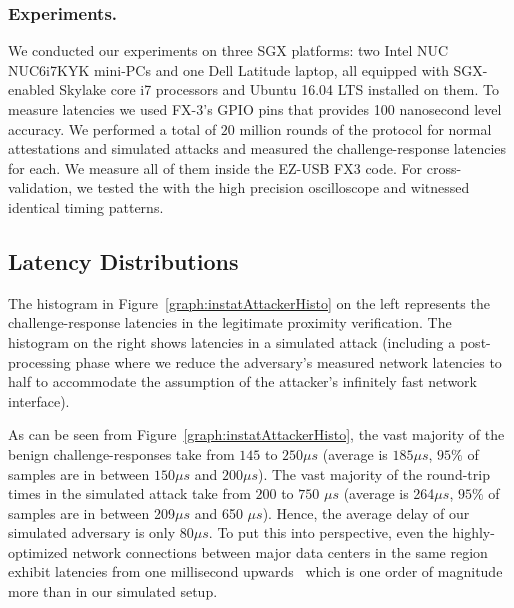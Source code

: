 \subsubsection{Experiments.}
We conducted our experiments on three SGX platforms: two Intel NUC NUC6i7KYK mini-PCs and one Dell Latitude laptop, all equipped with SGX-enabled Skylake core i7 processors and Ubuntu 16.04 LTS installed on them. To measure latencies we used FX-3's GPIO pins that provides 100 nanosecond level accuracy. We performed a total of $20$ million rounds of the protocol for normal attestations and simulated attacks and measured the challenge-response latencies for each. We measure all of them inside the EZ-USB FX3 code. For cross-validation, we tested the \device with the high precision oscilloscope and witnessed identical timing patterns.


\subsection{Latency Distributions}
\label{sec:evaluation:results}



The histogram in Figure~\ref{graph:instatAttackerHisto} on the left represents the challenge-response latencies in the legitimate proximity verification. The histogram on the right shows latencies in a simulated attack (including a post-processing phase where we reduce the adversary's measured network latencies to half to accommodate the assumption of the attacker's infinitely fast network interface).

As can be seen from Figure~\ref{graph:instatAttackerHisto}, the vast majority of the benign challenge-responses take from $145$ to $250 \mu s$ (average is $185 \mu s$, $95\%$ of samples are in between $150\mu s$ and  $200\mu s$). The vast majority of the round-trip times in the simulated attack take from $200$ to $750$ $\mu s$ (average is 264$\mu s$, $95\%$ of samples are in between 209$\mu s$ and 650 $\mu s$). Hence, the average delay of our simulated adversary is only $80 \mu s$. To put this into perspective, even the highly-optimized network connections between major data centers in the same region exhibit latencies from one millisecond upwards~\cite{agarwal_agarwal_2018} which is one order of magnitude more than in our simulated setup.



